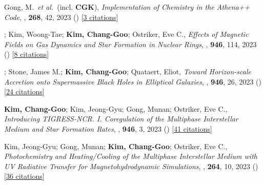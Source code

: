 \item[{5.}]Gong, M.~\textit{et al.}~(incl. \textbf{CGK}), \textit{Implementation of Chemistry in the Athena++ Code}, , \textbf{268}, 42, 2023 () [\href{http://adsabs.harvard.edu/abs/2023ApJS..268...42G}{3 citations}]

\item[{4.}]; Kim, Woong-Tae; \textbf{Kim, Chang-Goo}; Ostriker, Eve C., \textit{Effects of Magnetic Fields on Gas Dynamics and Star Formation in Nuclear Rings}, , \textbf{946}, 114, 2023 () [\href{http://adsabs.harvard.edu/abs/2023ApJ...946..114M}{8 citations}]

\item[{3.}]; Stone, James M.; \textbf{Kim, Chang-Goo}; Quataert, Eliot, \textit{Toward Horizon-scale Accretion onto Supermassive Black Holes in Elliptical Galaxies}, , \textbf{946}, 26, 2023 () [\href{http://adsabs.harvard.edu/abs/2023ApJ...946...26G}{24 citations}]

\item[{2.}]\textbf{Kim, Chang-Goo}; Kim, Jeong-Gyu; Gong, Munan; Ostriker, Eve C., \textit{Introducing TIGRESS-NCR. I. Coregulation of the Multiphase Interstellar Medium and Star Formation Rates}, , \textbf{946}, 3, 2023 () [\href{http://adsabs.harvard.edu/abs/2023ApJ...946....3K}{41 citations}]

\item[{1.}]Kim, Jeong-Gyu; Gong, Munan; \textbf{Kim, Chang-Goo}; Ostriker, Eve C., \textit{Photochemistry and Heating/Cooling of the Multiphase Interstellar Medium with UV Radiative Transfer for Magnetohydrodynamic Simulations}, , \textbf{264}, 10, 2023 () [\href{http://adsabs.harvard.edu/abs/2023ApJS..264...10K}{36 citations}]